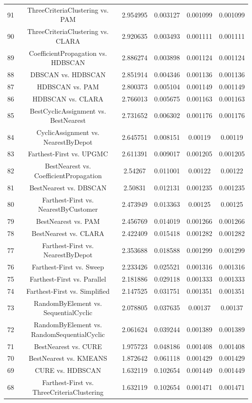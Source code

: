 \documentclass[a4paper,10pt]{article}
\begin{document}
\begin{landscape}
\begin{table}[!htp]
\begin{tabular}{cccccc}
91&ThreeCriteriaClustering vs. PAM&2.954995&0.003127&0.001099&0.001099\\
90&ThreeCriteriaClustering vs. CLARA&2.920635&0.003493&0.001111&0.001111\\
89&CoefficientPropagation vs. HDBSCAN&2.886274&0.003898&0.001124&0.001124\\
88&DBSCAN vs. HDBSCAN&2.851914&0.004346&0.001136&0.001136\\
87&HDBSCAN vs. PAM&2.800373&0.005104&0.001149&0.001149\\
86&HDBSCAN vs. CLARA&2.766013&0.005675&0.001163&0.001163\\
85&BestCyclicAssignment vs. BestNearest&2.731652&0.006302&0.001176&0.001176\\
84&CyclicAssignment vs. NearestByDepot&2.645751&0.008151&0.00119&0.00119\\
83&Farthest-First vs. UPGMC&2.611391&0.009017&0.001205&0.001205\\
82&BestNearest vs. CoefficientPropagation&2.54267&0.011001&0.00122&0.00122\\
81&BestNearest vs. DBSCAN&2.50831&0.012131&0.001235&0.001235\\
80&Farthest-First vs. NearestByCustomer&2.473949&0.013363&0.00125&0.00125\\
79&BestNearest vs. PAM&2.456769&0.014019&0.001266&0.001266\\
78&BestNearest vs. CLARA&2.422409&0.015418&0.001282&0.001282\\
77&Farthest-First vs. NearestByDepot&2.353688&0.018588&0.001299&0.001299\\
76&Farthest-First vs. Sweep&2.233426&0.025521&0.001316&0.001316\\
75&Farthest-First vs. Parallel&2.181886&0.029118&0.001333&0.001333\\
74&Farthest-First vs. Simplified&2.147525&0.031751&0.001351&0.001351\\
73&RandomByElement vs. SequentialCyclic&2.078805&0.037635&0.00137&0.00137\\
72&RandomByElement vs. RandomSequentialCyclic&2.061624&0.039244&0.001389&0.001389\\
71&BestNearest vs. CURE&1.975723&0.048186&0.001408&0.001408\\
70&BestNearest vs. KMEANS&1.872642&0.061118&0.001429&0.001429\\
69&CURE vs. HDBSCAN&1.632119&0.102654&0.001449&0.001449\\
68&Farthest-First vs. ThreeCriteriaClustering&1.632119&0.102654&0.001471&0.001471\\

\end{tabular}
\end{table}
\end{landscape}
\end{document}
